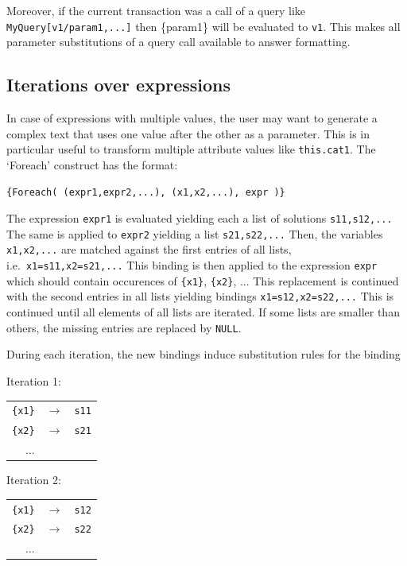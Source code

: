 Moreover, if the current transaction was a call of a query like {\tt MyQuery[v1/param1,...]} then
\{param1\} will be evaluated to {\tt v1}. This makes all parameter substitutions of a query call
available to answer formatting.

\subsection{Iterations over expressions}

In case of expressions with multiple values, the user may want to generate a 
complex text that uses one value after the other as a parameter. 
This is in particular useful to transform multiple attribute values like {\tt this.cat1}.
The `Foreach' construct has the format:

\verb+{Foreach( (expr1,expr2,...), (x1,x2,...), expr )}+

The expression {\tt expr1} is evaluated yielding each a list of solutions {\tt s11,s12,...} The same is applied to {\tt expr2} yielding a list
{\tt s21,s22,...} Then, the
variables {\tt x1,x2,...} are matched against the first entries of all lists, i.e.\ {\tt x1=s11,x2=s21,...} This binding is then applied to the expression
{\tt expr}
which should contain occurences of \verb+{x1}+, \verb+{x2}+, ... This replacement is continued with the second entries in all lists yielding bindings
{\tt x1=s12,x2=s22,...} This is continued until all elements of all lists are iterated. If some lists are smaller than others, the missing entries are replaced by {\tt NULL}.

During each iteration, the new bindings induce substitution rules for the binding

Iteration 1: \\
\begin{tabular}{rcl}
   \verb+{x1}+ & $ \longrightarrow $ & {\tt s11} \\
   \verb+{x2}+ & $ \longrightarrow $ & {\tt s21} \\
   ... \\
\end{tabular}

Iteration 2: \\
\begin{tabular}{rcl}
   \verb+{x1}+ & $ \longrightarrow $ & {\tt s12}\\
   \verb+{x2}+ & $ \longrightarrow $ & {\tt s22}\\
   ... \\
\end{tabular}

